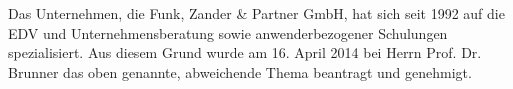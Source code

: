 Das Unternehmen, die Funk, Zander \& Partner GmbH, hat sich seit 1992 auf die EDV und Unternehmensberatung sowie anwenderbezogener Schulungen spezialisiert. Aus diesem Grund wurde am 16. April 2014 bei Herrn Prof. Dr. Brunner das oben genannte, abweichende Thema beantragt und genehmigt.
